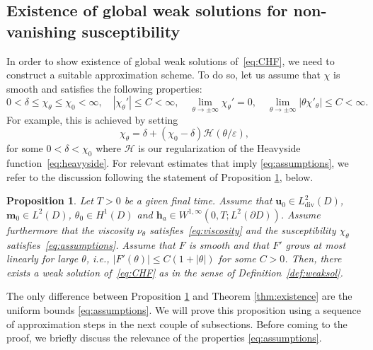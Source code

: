 \documentclass[10pt,letterpaper,twoside]{amsart}
\newtheorem{proposition}[lemma]{Proposition}
\theoremstyle{definition}{\newtheorem{definition}[lemma]{Definition}}
\theoremstyle{note}{\newtheorem{claim}{Claim}[section]
\newtheorem*{claim*}{Claim}}
\numberwithin{equation}{section}
\newcommand{\dom}{D}
\newcommand{\eps}{\varepsilon}
\newcommand{\Div}{\operatorname{div}}
\newcommand{\hdiv}{L^2_{\Div}(\dom)}
\newcommand{\bu}{\mathbf{u}}
\newcommand{\bm}{\mathbf{m}}
\newcommand{\bh}{\mathbf{h}}
\begin{document}
\subsection{Existence of global weak solutions for non-vanishing susceptibility}

In order to show existence of global weak solutions of~\eqref{eq:CHF}, we need to construct a suitable approximation scheme. To do so, let us assume that $\chi$ is smooth and satisfies the following properties:
\begin{equation}\label{eq:assumptions}
	0<\delta\leq \chi_\theta\leq \chi_0<\infty,\quad |\chi_\theta'|\leq C<\infty,\quad \lim_{\theta\to\pm\infty}\chi_\theta' = 0,\quad \lim_{\theta\to\pm\infty}|\theta\chi'_\theta|\leq C<\infty.
\end{equation}
For example, this is achieved by setting
\begin{equation}\label{eq:susceptibility}
	\chi_\theta = \delta+(\chi_0-\delta)\mathcal{H}(\theta/\eps),
\end{equation}
for some $0<\delta<\chi_0$ where $\mathcal{H}$ is our regularization of the Heavyside function~\eqref{eq:heavyside}.  For relevant estimates that imply \eqref{eq:assumptions}, we refer to the discussion following the statement of Proposition \ref{prop:existence}, below.  
\begin{proposition}\label{prop:existence}
	Let $T>0$ be a given final time. Assume that $\bu_0\in \hdiv$, $\bm_0\in L^2(\dom)$, $\theta_0\in H^1(\dom)$ and $\bh_a\in W^{1,\infty}(0,T;L^2(\partial\dom))$. Assume furthermore that the viscosity $\nu_\theta$ satisfies~\eqref{eq:viscosity} and the susceptibility $\chi_\theta$ satisfies~\eqref{eq:assumptions}. Assume that $F$ is smooth and that $F'$ grows at most linearly for large $\theta$, i.e., $|F'(\theta)|\leq C(1+|\theta|)$ for some $C>0$. Then, there exists a weak solution of~\eqref{eq:CHF} as in the sense of Definition~\ref{def:weaksol}.
\end{proposition}
The only difference between Proposition \ref{prop:existence} and Theorem \ref{thm:existence} are the uniform bounds \eqref{eq:assumptions}.
We will prove this proposition using a sequence of approximation steps in the next couple of subsections. Before coming to the proof, we briefly discuss the relevance of the properties \eqref{eq:assumptions}.
\end{document}
